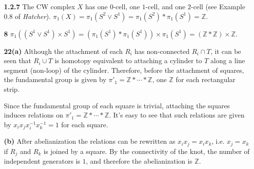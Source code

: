 \documentclass{article}
\makeatletter
\newcommand*{\shifttext}[1]{%
  \settowidth{\@tempdima}{#1}%
  \hspace{-\@tempdima}#1%
}
\newcommand{\plabel}[1]{%
\shifttext{\textbf{#1}\quad}%
}
\newcommand{\prule}{%
\begin{center}%
\hdashrule[0.5ex]{.99\linewidth}{1pt}{1pt 2.5pt}%
\end{center}%
}
\makeatother
\begin{document}
\prule

\plabel{1.2.7}%
The CW complex $X$ has one $0$-cell, one $1$-cell, and one $2$-cell (see Example 0.8 of \textit{Hatcher}).
$\pi_1(X) = \pi_1(S^2\vee S^1) = \pi_1(S^2) * \pi_1(S^1) = \mathbb{Z}$.

\plabel{8}%
$\pi_1((S^1 \vee S^1) \times S^1) = (\pi_1(S^1) * \pi_1(S^1)) \times \pi_1(S^1) = (\mathbb{Z} * \mathbb{Z}) \times \mathbb{Z}$.

\plabel{22(a)}%
Although the attachment of each $R_i$ has non-connected $R_i\cap T$, it can be seen that $R_i\cup T$ is homotopy equivalent to attaching a cylinder to $T$ along a line segment (non-loop) of the cylinder.
Therefore, before the attachment of squares, the fundamental group is given by $\pi'_1 = \mathbb{Z} * \cdots * \mathbb{Z}$, one $\mathbb{Z}$ for each rectangular strip.
\par
Since the fundamental group of each square is trivial, attaching the squares induces relations on $\pi'_1 = \mathbb{Z} * \cdots * \mathbb{Z}$.
It's easy to see that such relations are given by $x_i x_j x_i^{-1} x_k^{-1} = 1$ for each square.

\plabel{(b)}%
After abelianization the relations can be rewritten as $x_i x_j = x_i x_k$, i.e. $x_j = x_k$ if $R_j$ and $R_k$ is joined by a square.
By the connectivity of the knot, the number of independent generators is $1$, and therefore the abelianization is $\mathbb{Z}$.
\end{document}
